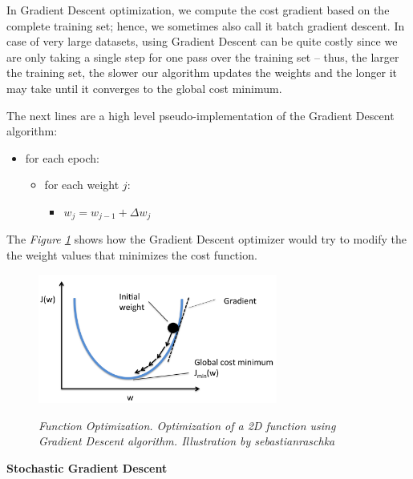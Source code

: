 In Gradient Descent optimization, we compute the cost gradient based on the complete training set; hence, we sometimes also call it batch gradient descent. In case of very large datasets, using Gradient Descent can be quite costly since we are only taking a single step for one pass over the training set – thus, the larger the training set, the slower our algorithm updates the weights and the longer it may take until it converges to the global cost minimum. \\

\newpage

The next lines are a high level pseudo-implementation of the Gradient Descent algorithm:

\begin{itemize}[label=\(\circ\)]
  \item for each epoch:
  \begin{itemize}[label=\(\circ\), topsep=0pt]
    \item for each weight \(j\):
    \begin{itemize}[label=\(\circ\), topsep=5pt]
      \item \(w_j = w_{j-1} + \Delta w_j\)
    \end{itemize}
  \end{itemize}
\end{itemize}

The \textit{Figure \ref{fig:optimization}} shows how the Gradient Descent optimizer would try to modify the  the weight values that minimizes the cost function.

\begin{figure}[H]
\centering
\includegraphics[width=0.7\textwidth]{imatges/preliminaries/optimization.png}
    \caption[Function Optimization]{\textit{Function Optimization. Optimization of a 2D function using Gradient Descent algorithm. Illustration by sebastianraschka}}
{\label{fig:optimization}}
\end{figure}

\vspace{0.5cm}
\textbf{Stochastic Gradient Descent} \\

